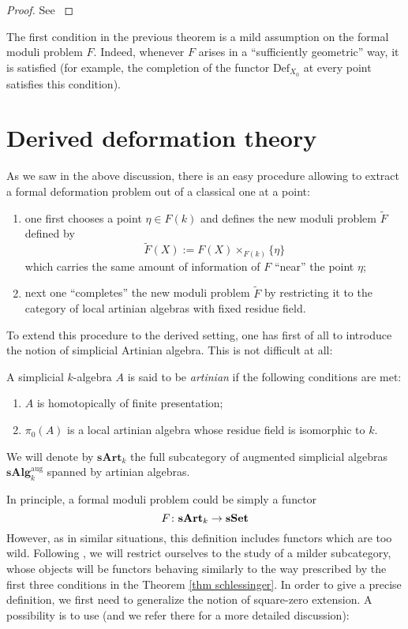 \begin{refsection}
\begin{proof}
See \cite[Theorem 2.3.2]{sernesi}
\end{proof}

The first condition in the previous theorem is a mild assumption on the formal moduli problem $F$. Indeed, whenever $F$ arises in a ``sufficiently geometric'' way, it is satisfied (for example, the completion of the functor $\mathrm{Def}_{X_0}$ at every point satisfies this condition).

\section{Derived deformation theory}

As we saw in the above discussion, there is an easy procedure allowing to extract a formal deformation problem out of a classical one at a point:
\begin{enumerate}
\item one first chooses a point $\eta \in F(k)$ and defines the new moduli problem $\widetilde{F}$ defined by
\[
\widetilde{F}(X) := F(X) \times_{F(k)} \{\eta\}
\]
which carries the same amount of information of $F$ ``near'' the point $\eta$;
\item next one ``completes'' the new moduli problem $\widetilde{F}$ by restricting it to the category of local artinian algebras with fixed residue field.
\end{enumerate}

To extend this procedure to the derived setting, one has first of all to introduce the notion of simplicial Artinian algebra. This is not difficult at all:

\begin{defin}
A simplicial $k$-algebra $A$ is said to be \emph{artinian} if the following conditions are met:
\begin{enumerate}
\item $A$ is homotopically of finite presentation;

\item $\pi_0(A)$ is a local artinian algebra whose residue field is isomorphic to $k$.
\end{enumerate}
We will denote by $\mathbf{sArt}_k$ the full subcategory of augmented simplicial algebras $\mathbf{sAlg}_{k}^{\mathrm{aug}}$ spanned by artinian algebras.
\end{defin}

In principle, a formal moduli problem could be simply a functor
\[
F \colon \mathbf{sArt}_k \to \mathbf{sSet}
\]
However, as in similar situations, this definition includes functors which are too wild. Following \cite{dagx}, we will restrict ourselves to the study of a milder subcategory, whose objects will be functors behaving similarly to the way prescribed by the first three conditions in the Theorem \ref{thm schlessinger}. In order to give a precise definition, we first need to generalize the notion of square-zero extension. A possibility is to use \cite[Definition 1.1]{infinitesimalextension} (and we refer there for a more detailed discussion):


\end{refsection}
